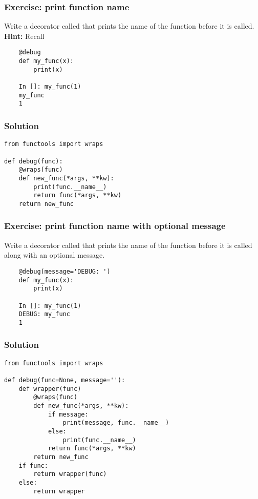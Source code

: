 \documentclass[14pt,compress,aspectratio=169]{beamer}
\begin{document}
\begin{frame}
  \frametitle{Exercise: print function name}
  \begin{block}{}
    Write a decorator called  that prints the name of the function
    before it is called.  \textbf{Hint:} Recall 
  \end{block}

\begin{lstlisting}
    @debug
    def my_func(x):
        print(x)

    In []: my_func(1)
    my_func
    1
\end{lstlisting}
\end{frame}


\begin{frame}
  \frametitle{Solution}
\begin{lstlisting}
from functools import wraps

def debug(func):
    @wraps(func)
    def new_func(*args, **kw):
        print(func.__name__)
        return func(*args, **kw)
    return new_func
\end{lstlisting}
\end{frame}


\begin{frame}
  \frametitle{Exercise: print function name with optional message}
  \begin{block}{}
    Write a decorator called  that prints the name of
    the function before it is called along with an optional message.
  \end{block}

\begin{lstlisting}
    @debug(message='DEBUG: ')
    def my_func(x):
        print(x)

    In []: my_func(1)
    DEBUG: my_func
    1
\end{lstlisting}
\end{frame}


\begin{frame}
  \frametitle{Solution}
  \vspace*{-0.1in}
  \small
\begin{lstlisting}
from functools import wraps

def debug(func=None, message=''):
    def wrapper(func)
        @wraps(func)
        def new_func(*args, **kw):
            if message:
                print(message, func.__name__)
            else:
                print(func.__name__)
            return func(*args, **kw)
        return new_func
    if func:
        return wrapper(func)
    else:
        return wrapper
\end{lstlisting}
\end{frame}
\end{document}

